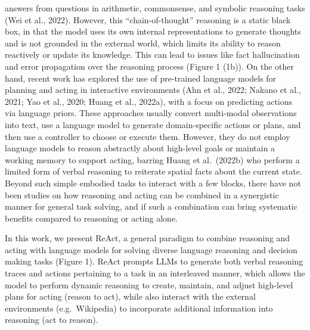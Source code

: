 \documentclass[
]{article}
\begin{document}
answers from questions in arithmetic, commonsense, and symbolic
reasoning tasks (Wei et al., 2022). However, this ``chain-of-thought''
reasoning is a static black box, in that the model uses its own internal
representations to generate thoughts and is not grounded in the external
world, which limits its ability to reason reactively or update its
knowledge. This can lead to issues like fact hallucination and error
propagation over the reasoning process (Figure 1 (1b)). On the other
hand, recent work has explored the use of pre-trained language models
for planning and acting in interactive environments (Ahn et al., 2022;
Nakano et al., 2021; Yao et al., 2020; Huang et al., 2022a), with a
focus on predicting actions via language priors. These approaches
usually convert multi-modal observations into text, use a language model
to generate domain-specific actions or plans, and then use a controller
to choose or execute them. However, they do not employ language models
to reason abstractly about high-level goals or maintain a working memory
to support acting, barring Huang et al.~(2022b) who perform a limited
form of verbal reasoning to reiterate spatial facts about the current
state. Beyond such simple embodied tasks to interact with a few blocks,
there have not been studies on how reasoning and acting can be combined
in a synergistic manner for general task solving, and if such a
combination can bring systematic benefits compared to reasoning or
acting alone.

In this work, we present ReAct, a general paradigm to combine reasoning
and acting with language models for solving diverse language reasoning
and decision making tasks (Figure 1). ReAct prompts LLMs to generate
both verbal reasoning traces and actions pertaining to a task in an
interleaved manner, which allows the model to perform dynamic reasoning
to create, maintain, and adjust high-level plans for acting (reason to
act), while also interact with the external environments
(e.g.~Wikipedia) to incorporate additional information into reasoning
(act to reason).
\end{document}
